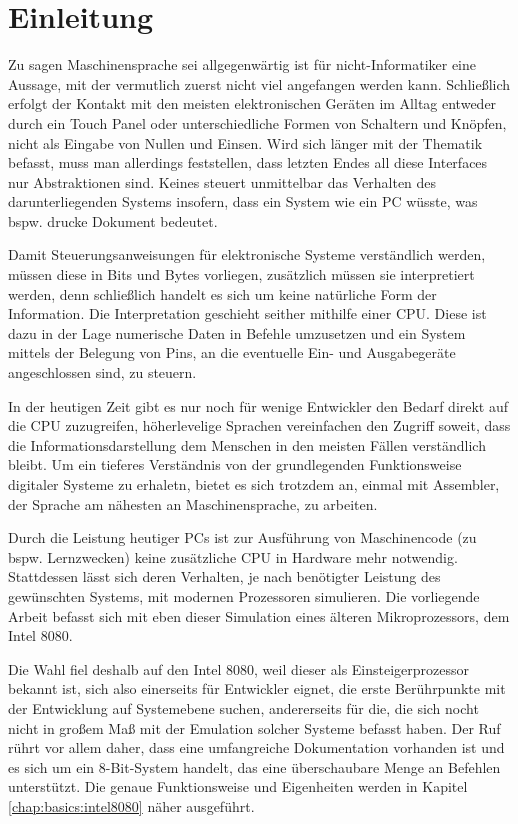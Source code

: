 \chapter{Einleitung}

Zu sagen Maschinensprache sei allgegenwärtig ist für nicht-Informatiker eine Aussage, mit der vermutlich zuerst nicht viel angefangen werden kann. Schließlich erfolgt der Kontakt mit den meisten elektronischen Geräten im Alltag entweder durch ein Touch Panel oder unterschiedliche Formen von Schaltern und Knöpfen, nicht als Eingabe von Nullen und Einsen. Wird sich länger mit der Thematik befasst, muss man allerdings feststellen, dass letzten Endes all diese Interfaces nur Abstraktionen sind. Keines steuert unmittelbar das Verhalten des darunterliegenden Systems insofern, dass ein System wie ein PC wüsste, was bspw. \glqq drucke Dokument\grqq{} bedeutet.

Damit Steuerungsanweisungen für elektronische Systeme verständlich werden, müssen diese in Bits und Bytes vorliegen, zusätzlich müssen sie interpretiert werden, denn schließlich handelt es sich um keine natürliche Form der Information. Die Interpretation geschieht seither mithilfe einer \ac{CPU}. Diese ist dazu in der Lage numerische Daten in Befehle umzusetzen und ein System mittels der Belegung von Pins, an die eventuelle Ein- und Ausgabegeräte angeschlossen sind, zu steuern.

In der heutigen Zeit gibt es nur noch für wenige Entwickler den Bedarf direkt auf die \ac{CPU} zuzugreifen, höherlevelige Sprachen vereinfachen den Zugriff soweit, dass die Informationsdarstellung dem Menschen in den meisten Fällen verständlich bleibt. Um ein tieferes Verständnis von der grundlegenden Funktionsweise digitaler Systeme zu erhaletn, bietet es sich trotzdem an, einmal mit Assembler, der Sprache am nähesten an Maschinensprache, zu arbeiten.

Durch die Leistung heutiger PCs ist zur Ausführung von Maschinencode (zu bspw. Lernzwecken) keine zusätzliche \ac{CPU} in Hardware mehr notwendig. Stattdessen lässt sich deren Verhalten, je nach benötigter Leistung des gewünschten Systems, mit modernen Prozessoren simulieren. Die vorliegende Arbeit befasst sich mit eben dieser Simulation eines älteren Mikroprozessors, dem Intel 8080.

Die Wahl fiel deshalb auf den Intel 8080, weil dieser als \glqq Einsteigerprozessor\grqq{} bekannt ist, sich also einerseits für Entwickler eignet, die erste Berührpunkte mit der Entwicklung auf Systemebene suchen, andererseits für die, die sich nocht nicht in großem Maß mit der Emulation solcher Systeme befasst haben. Der Ruf rührt vor allem daher, dass eine umfangreiche Dokumentation vorhanden ist und es sich um ein 8-Bit-System handelt, das eine überschaubare Menge an Befehlen unterstützt. Die genaue Funktionsweise und Eigenheiten werden in Kapitel \ref{chap:basics:intel8080} näher ausgeführt.

